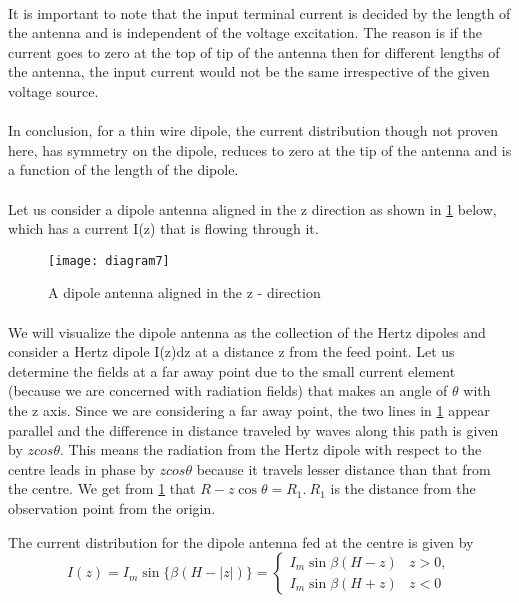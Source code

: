 \paragraph{}
It is important to note that the input terminal current is decided by the length of the antenna and is independent of the voltage excitation. The reason is if the current goes to zero at the top of tip of the antenna then for different lengths of the antenna, the input current would not be the same irrespective of the given voltage source.
\paragraph{}
In conclusion, for a thin wire dipole, the current distribution though not proven here, has symmetry on the dipole, reduces to zero at the tip of the antenna and is a function of the length of the dipole.
\paragraph{} 
Let us consider a dipole antenna aligned in the z direction as shown in \ref{figure3} below, which has a current I(z) that is flowing through it. 

 \begin{figure}
 	\centering
 	\texttt{[image: diagram7]}
 	\caption{A dipole antenna aligned in the z - direction}
 	\label{figure3}
 \end{figure}
 
 
\paragraph{}
We will visualize the dipole antenna as the collection of the Hertz dipoles and consider a Hertz dipole I(z)dz at a distance z from the feed point. Let us determine the fields at a far away point due to the small current element (because we are concerned with radiation fields) that makes an angle of $\theta$ with the z axis. Since we are considering a far away point, the two lines in \ref{figure3} appear parallel and the difference in distance traveled by waves along this path is given by $zcos\theta$. This means the radiation from the Hertz dipole with respect to the centre leads in phase by $zcos\theta$ because it travels lesser distance than that from the centre. We get from \ref{figure3} that $R - z\cos\theta = R_1. \ R_1$ is the distance from the observation point from the origin. 

The current distribution for the dipole antenna fed at the centre is given by
$$I(z) = I_m\sin \{\beta(H -|z|)\} = \begin{cases} I_m\sin{\beta(H - z)}& \text{$z > 0,$}\\
I_m\sin{\beta(H + z)}&\text{$z < 0$}	\end{cases}
$$

